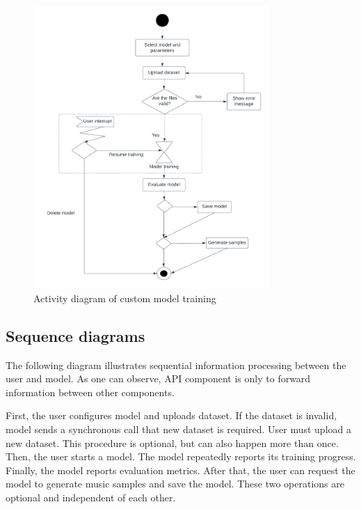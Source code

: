 \documentclass{article}
\begin{document}
\begin{figure}[H]
    \centering
    \includegraphics[width=0.8\textwidth]{activitydiagram.png}
    \caption{Activity diagram of custom model training}
\end{figure}

\subsection{Sequence diagrams}

The following diagram illustrates sequential information processing between the user and model. As one can observe, API component is only to forward information between other components.

First, the user configures model and uploads dataset. If the dataset is invalid, model sends a synchronous call that new dataset is required. User must upload a new dataset. This procedure is optional, but can also happen more than once.
Then, the user starts a model. The model repeatedly reports its training progress. Finally, the model reports evaluation metrics. After that, the user can request the model to generate music samples and save the model. These two operations are optional and independent of each other.
\end{document}
